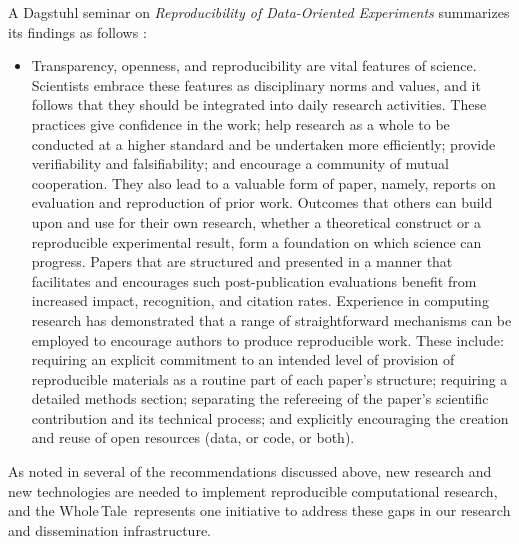\documentclass[review]{elsarticle}
\newcommand{\wt}{Whole\,Tale}
\begin{document}
\noindent A Dagstuhl seminar on \emph{Reproducibility of Data-Oriented Experiments} summarizes its findings as follows \cite{freire2016reproducibility}:
\begin{itemize}
\item
Transparency, openness, and reproducibility are vital features of science. Scientists embrace these features as disciplinary norms and values, and it follows that they should be integrated into daily research activities. These practices give confidence in the work; help research as a whole to be conducted at a higher standard and be undertaken more efficiently; provide verifiability and falsifiability; and encourage a community of mutual cooperation. They also lead to a valuable form of paper, namely, reports on evaluation and reproduction of prior work. Outcomes that others can build upon and use for their own research, whether a theoretical construct or a reproducible experimental result, form a foundation on which science can progress. Papers that are structured and presented in a manner that facilitates and encourages such post-publication evaluations benefit from increased impact, recognition, and citation rates.
Experience in computing research has demonstrated that a range of straightforward mechanisms can be employed to encourage authors to produce reproducible work. These include: requiring an explicit commitment to an intended level of provision of reproducible materials as a routine part of each paper's structure; requiring a detailed methods section; separating the refereeing of the paper's scientific contribution and its technical process; and explicitly encouraging the creation and reuse of open resources (data, or code, or both).
\end{itemize}

As noted in several of the recommendations discussed above, new research and new technologies are needed to implement reproducible computational research, and the \wt\ represents one initiative to address these gaps in our research and dissemination infrastructure. 

\end{document}
